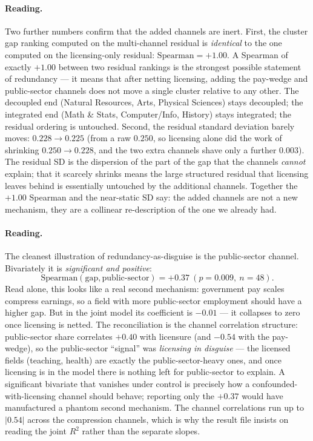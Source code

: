 \documentclass[11pt]{article}
\begin{document}
\paragraph{Reading.} Two further numbers confirm that the added channels are inert. First, the cluster gap ranking computed on the multi-channel residual is \emph{identical} to the one computed on the licensing-only residual: $\mathrm{Spearman}=+1.00$. A Spearman of exactly $+1.00$ between two residual rankings is the strongest possible statement of redundancy --- it means that after netting licensing, adding the pay-wedge and public-sector channels does not move a single cluster relative to any other. The decoupled end (Natural Resources, Arts, Physical Sciences) stays decoupled; the integrated end (Math \& Stats, Computer/Info, History) stays integrated; the residual ordering is untouched. Second, the residual standard deviation barely moves: $0.228 \to 0.225$ (from a raw $0.250$, so licensing alone did the work of shrinking $0.250\to0.228$, and the two extra channels shave only a further $0.003$). The residual SD is the dispersion of the part of the gap that the channels \emph{cannot} explain; that it scarcely shrinks means the large structured residual that licensing leaves behind is essentially untouched by the additional channels. Together the $+1.00$ Spearman and the near-static SD say: the added channels are not a new mechanism, they are a collinear re-description of the one we already had.

\paragraph{Reading.} The cleanest illustration of redundancy-as-disguise is the public-sector channel. Bivariately it is \emph{significant and positive}:
\[
\mathrm{Spearman}(\mathrm{gap},\text{public-sector}) = +0.37\ (p=0.009,\ n=48).
\]
Read alone, this looks like a real second mechanism: government pay scales compress earnings, so a field with more public-sector employment should have a higher gap. But in the joint model its coefficient is $-0.01$ --- it collapses to zero once licensing is netted. The reconciliation is the channel correlation structure: public-sector share correlates $+0.40$ with licensure (and $-0.54$ with the pay-wedge), so the public-sector ``signal'' was \emph{licensing in disguise} --- the licensed fields (teaching, health) are exactly the public-sector-heavy ones, and once licensing is in the model there is nothing left for public-sector to explain. A significant bivariate that vanishes under control is precisely how a confounded-with-licensing channel should behave; reporting only the $+0.37$ would have manufactured a phantom second mechanism. The channel correlations run up to $|0.54|$ across the compression channels, which is why the result file insists on reading the joint $R^2$ rather than the separate slopes.
\end{document}
